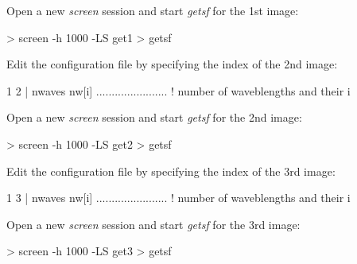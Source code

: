 \documentclass[a4paper,10pt]{article}
\begin{document}
Open a new \textsl{screen} session and start \textsl{getsf} for the 1st image:
\begin{verbnobox}[\mbox{}\small]
> screen -h 1000 -LS get1
> getsf
\end{verbnobox}
Edit the configuration file by specifying the index of the 2nd image:
\begin{verbnobox}[\mbox{}\small]
 1 2                 | nwaves nw[i] ....................... ! number of waveblengths and their i
\end{verbnobox}
Open a new \textsl{screen} session and start \textsl{getsf} for the 2nd image:
\begin{verbnobox}[\mbox{}\small]
> screen -h 1000 -LS get2
> getsf
\end{verbnobox}
Edit the configuration file by specifying the index of the 3rd image:
\begin{verbnobox}[\mbox{}\small]
 1 3                 | nwaves nw[i] ....................... ! number of waveblengths and their i
\end{verbnobox}
Open a new \textsl{screen} session and start \textsl{getsf} for the 3rd image:
\begin{verbnobox}[\mbox{}\small]
> screen -h 1000 -LS get3
> getsf
\end{verbnobox}
\end{document}
